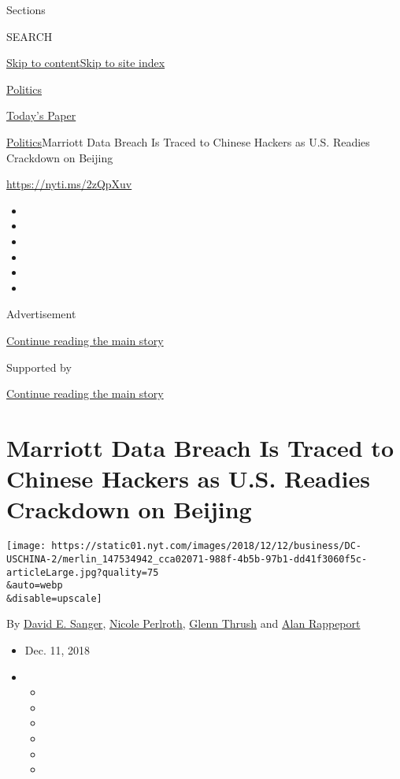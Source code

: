 Sections

SEARCH

\protect\hyperlink{site-content}{Skip to
content}\protect\hyperlink{site-index}{Skip to site index}

\href{https://www.nytimes.com/section/politics}{Politics}

\href{https://myaccount.nytimes.com/auth/login?response_type=cookie\&client_id=vi}{}

\href{https://www.nytimes.com/section/todayspaper}{Today's Paper}

\href{/section/politics}{Politics}\textbar{}Marriott Data Breach Is
Traced to Chinese Hackers as U.S. Readies Crackdown on Beijing

\url{https://nyti.ms/2zQpXuv}

\begin{itemize}
\item
\item
\item
\item
\item
\item
\end{itemize}

Advertisement

\protect\hyperlink{after-top}{Continue reading the main story}

Supported by

\protect\hyperlink{after-sponsor}{Continue reading the main story}

\hypertarget{marriott-data-breach-is-traced-to-chinese-hackers-as-us-readies-crackdown-on-beijing}{%
\section{Marriott Data Breach Is Traced to Chinese Hackers as U.S.
Readies Crackdown on
Beijing}\label{marriott-data-breach-is-traced-to-chinese-hackers-as-us-readies-crackdown-on-beijing}}

\texttt{[image: https://static01.nyt.com/images/2018/12/12/business/DC-USCHINA-2/merlin\_147534942\_cca02071-988f-4b5b-97b1-dd41f3060f5c-articleLarge.jpg?quality=75\\\&auto=webp\\\&disable=upscale]}

By \href{https://www.nytimes.com/by/david-e-sanger}{David E. Sanger},
\href{https://www.nytimes.com/by/nicole-perlroth}{Nicole Perlroth},
\href{https://www.nytimes.com/by/glenn-thrush}{Glenn Thrush} and
\href{https://www.nytimes.com/by/alan-rappeport}{Alan Rappeport}

\begin{itemize}
\item
  Dec. 11, 2018
\item
  \begin{itemize}
  \item
  \item
  \item
  \item
  \item
  \item
  \end{itemize}
\end{itemize}

